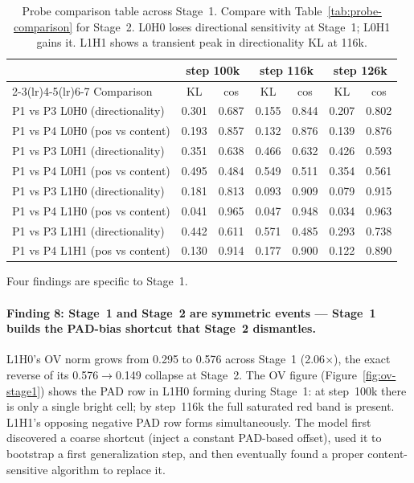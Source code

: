 \documentclass[11pt, a4paper]{article}
\begin{document}
\begin{table}[H]
\centering
\small
\begin{tabular}{@{}lcccccc@{}}
\toprule
 & \multicolumn{2}{c}{step 100k} & \multicolumn{2}{c}{step 116k} & \multicolumn{2}{c}{step 126k} \\
\cmidrule(lr){2-3}\cmidrule(lr){4-5}\cmidrule(lr){6-7}
Comparison & KL & cos & KL & cos & KL & cos \\
\midrule
P1 vs P3 \;L0H0\; (directionality)  & 0.301 & 0.687 & 0.155 & 0.844 & 0.207 & 0.802 \\
P1 vs P4 \;L0H0\; (pos vs content)  & 0.193 & 0.857 & 0.132 & 0.876 & 0.139 & 0.876 \\
\midrule
P1 vs P3 \;L0H1\; (directionality)  & 0.351 & 0.638 & 0.466 & 0.632 & 0.426 & 0.593 \\
P1 vs P4 \;L0H1\; (pos vs content)  & 0.495 & 0.484 & 0.549 & 0.511 & 0.354 & 0.561 \\
\midrule
P1 vs P3 \;L1H0\; (directionality)  & 0.181 & 0.813 & 0.093 & 0.909 & 0.079 & 0.915 \\
P1 vs P4 \;L1H0\; (pos vs content)  & 0.041 & 0.965 & 0.047 & 0.948 & 0.034 & 0.963 \\
\midrule
P1 vs P3 \;L1H1\; (directionality)  & 0.442 & 0.611 & 0.571 & 0.485 & 0.293 & 0.738 \\
P1 vs P4 \;L1H1\; (pos vs content)  & 0.130 & 0.914 & 0.177 & 0.900 & 0.122 & 0.890 \\
\bottomrule
\end{tabular}
\caption{Probe comparison table across Stage~1.  Compare with
  Table~\ref{tab:probe-comparison} for Stage~2.  L0H0 loses directional
  sensitivity at Stage~1; L0H1 gains it.  L1H1 shows a transient peak in
  directionality KL at 116k.}
\label{tab:probe-stage1}
\end{table}

Four findings are specific to Stage~1.

\paragraph{Finding 8: Stage~1 and Stage~2 are symmetric events — Stage~1 builds
the PAD-bias shortcut that Stage~2 dismantles.}
L1H0's OV norm grows from 0.295 to 0.576 across Stage~1 (2.06$\times$), the
exact reverse of its 0.576$\to$0.149 collapse at Stage~2.  The OV figure
(Figure~\ref{fig:ov-stage1}) shows the PAD row in L1H0 forming during Stage~1:
at step~100k there is only a single bright cell; by step~116k the full saturated
red band is present.  L1H1's opposing negative PAD row forms simultaneously.
The model first discovered a coarse shortcut (inject a constant PAD-based
offset), used it to bootstrap a first generalization step, and then eventually
found a proper content-sensitive algorithm to replace it.
\end{document}
